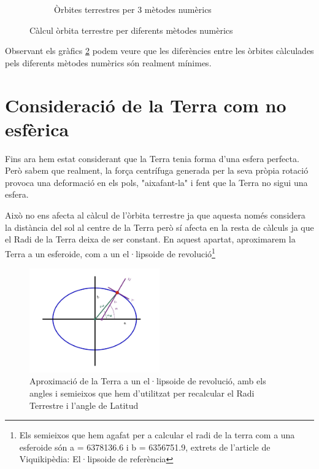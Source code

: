 \documentclass[11pt]{article}
\begin{document}
\begin{figure}[hbt!]
\begin{subfigure}{0.5\textwidth}
        \caption{Òrbites terrestres per 3 mètodes numèrics}
        \label{fig: orbita3met}
    \end{subfigure}
    \caption{Càlcul òrbita terrestre per diferents mètodes numèrics}
    \label{fig: grafics3met}
\end{figure}

Observant els gràfics \ref{fig: grafics3met} podem veure que les diferències entre les òrbites càlculades pels diferents mètodes numèrics són realment mínimes.

\section{Consideració de la Terra com no esfèrica}\label{sec: terranoesfera}
Fins ara hem estat considerant que la Terra tenia forma d'una esfera perfecta. Però sabem que realment, la força centrífuga generada per la seva pròpia rotació provoca una deformació en els pols, "aixafant-la" i fent que la Terra no sigui una esfera.

Això no ens afecta al càlcul de l'òrbita terrestre ja que aquesta només considera la distància del sol al centre de la Terra però sí afecta en la resta de càlculs ja que el Radi de la Terra deixa de ser constant. En aquest apartat, aproximarem la Terra a un esferoide, com a un el·lipsoide de revolució\footnote{\label{nota: elipsoide}Els semieixos que hem agafat per a calcular el radi de la terra com a una esferoide són a = 6378136.6 i b = 6356751.9, extrets de l'article de Viquikipèdia: El·lipsoide de referència}

\begin{figure}[hbt]
    \centering
    \includegraphics[width=0.5\textwidth]{Terraelipsoide.jpg}
    \caption{Aproximació de la Terra a un el·lipsoide de revolució, amb els angles i semieixos que hem d'utilitzat per recalcular el Radi Terrestre i l'angle de Latitud}
    \label{fig:terraelipsoide}
\end{figure}
\end{document}
